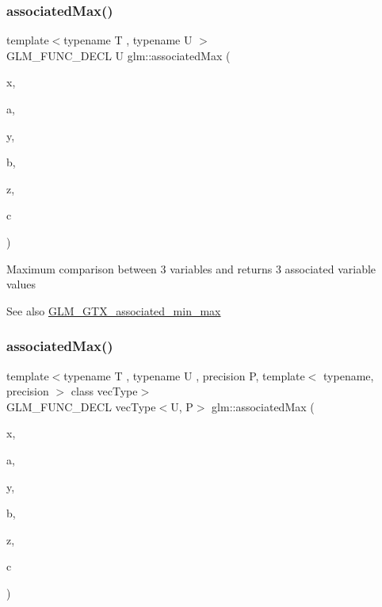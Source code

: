 \subsubsection{\texorpdfstring{associated\+Max()}{associatedMax()}\hspace{0.1cm}{\footnotesize\ttfamily [5/12]}}
{\footnotesize\ttfamily template$<$typename T , typename U $>$ \\
G\+L\+M\+\_\+\+F\+U\+N\+C\+\_\+\+D\+E\+CL U glm\+::associated\+Max (\begin{DoxyParamCaption}\item[{T}]{x,  }\item[{U}]{a,  }\item[{T}]{y,  }\item[{U}]{b,  }\item[{T}]{z,  }\item[{U}]{c }\end{DoxyParamCaption})}

Maximum comparison between 3 variables and returns 3 associated variable values \begin{DoxySeeAlso}{See also}
\hyperlink{group__gtx__associated__min__max}{G\+L\+M\+\_\+\+G\+T\+X\+\_\+associated\+\_\+min\+\_\+max} 
\end{DoxySeeAlso}
\mbox{\label{group__gtx__associated__min__max_ga065a0c1eb7837118ef79be88dfd78487}} 
\subsubsection{\texorpdfstring{associated\+Max()}{associatedMax()}\hspace{0.1cm}{\footnotesize\ttfamily [6/12]}}
{\footnotesize\ttfamily template$<$typename T , typename U , precision P, template$<$ typename, precision $>$ class vec\+Type$>$ \\
G\+L\+M\+\_\+\+F\+U\+N\+C\+\_\+\+D\+E\+CL vec\+Type$<$U, P$>$ glm\+::associated\+Max (\begin{DoxyParamCaption}\item[{vec\+Type$<$ T, P $>$ const \&}]{x,  }\item[{vec\+Type$<$ U, P $>$ const \&}]{a,  }\item[{vec\+Type$<$ T, P $>$ const \&}]{y,  }\item[{vec\+Type$<$ U, P $>$ const \&}]{b,  }\item[{vec\+Type$<$ T, P $>$ const \&}]{z,  }\item[{vec\+Type$<$ U, P $>$ const \&}]{c }\end{DoxyParamCaption})}

